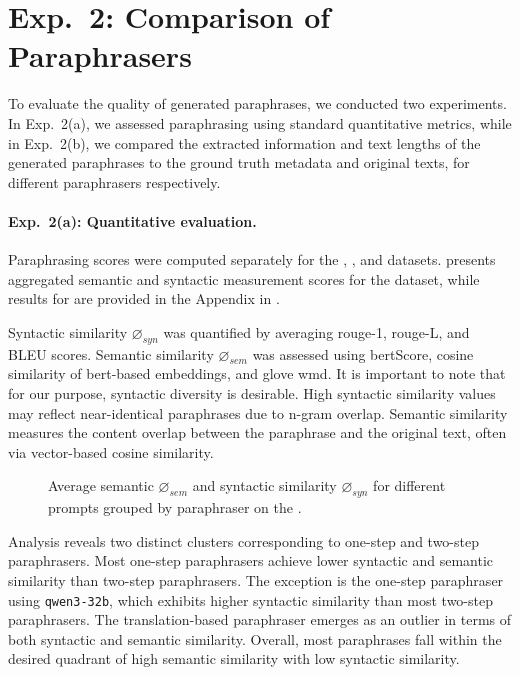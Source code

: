 \section{Exp.\ 2: Comparison of Paraphrasers}
\label{sec:comp_paraphrases}

To evaluate the quality of generated paraphrases, we conducted two experiments. 
In Exp.\ 2(a), we assessed paraphrasing using standard quantitative metrics, while in Exp.\ 2(b), we compared the extracted information and text lengths of the generated paraphrases to the ground truth metadata and original texts, for different paraphrasers respectively.

\paragraph{Exp.\ 2(a): Quantitative evaluation.}

Paraphrasing scores were computed separately for the \dataBlog{}, \dataGutenberg{}, and \dataStudent{} datasets. 
 presents aggregated semantic and syntactic measurement scores for the \dataBlog{} dataset, while results for \dataGutenberg{} are provided in the Appendix in .

Syntactic similarity $\diameter_{syn}$ was quantified by averaging \ac{rouge}-1, \ac{rouge}-L, and BLEU scores. 
Semantic similarity $\diameter_{sem}$ was assessed using \ac{bert}Score, cosine similarity of \ac{bert}-based embeddings, and \acs{glove} \ac{wmd}. 
It is important to note that for our purpose, syntactic diversity is desirable.
High syntactic similarity values may reflect near-identical paraphrases due to n-gram overlap. 
Semantic similarity measures the content overlap between the paraphrase and the original text, often via vector-based cosine similarity. 

\begin{figure}[htbp]
    \centering
    
    \caption[Comparison of paraphrasers on the \dataBlog{} dataset]{Average semantic $\diameter_{sem}$ and syntactic similarity $\diameter_{syn}$ for different prompts grouped by paraphraser on the \dataBlog{}.}
    \label{fig:sem_syn_blog}
\end{figure}


Analysis reveals two distinct clusters corresponding to one-step and two-step paraphrasers. 
Most one-step paraphrasers achieve lower syntactic and semantic similarity than two-step paraphrasers. 
The exception is the one-step paraphraser using \texttt{qwen3-32b}, which exhibits higher syntactic similarity than most two-step paraphrasers. 
The translation-based paraphraser emerges as an outlier in terms of both syntactic and semantic similarity. 
Overall, most paraphrases fall within the desired quadrant of high semantic similarity with low syntactic similarity.


